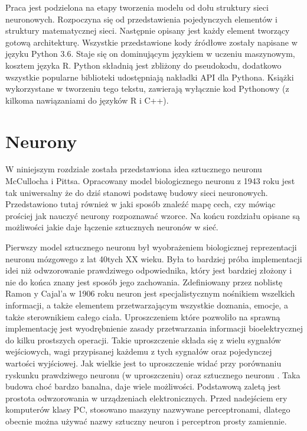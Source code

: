 \documentclass[12pt,a4paper,twoside,titlepage,openright]{book}
\begin{document}
Praca jest podzielona na etapy tworzenia modelu od dołu struktury sieci neuronowych. Rozpoczyna się od przedstawienia pojedynczych elementów i struktury matematycznej sieci. Następnie opisany jest każdy element tworzący gotową architekturę.
Wszystkie przedstawione kody źródłowe zostały napisane w języku Python 3.6. Staje się on dominującym językiem w uczeniu maszynowym, kosztem języka R. Python składnią jest zbliżony do pseudokodu, dodatkowo wszystkie popularne biblioteki udostępniają nakładki API dla Pythona. Książki wykorzystane w tworzeniu tego tekstu, zawierają wyłącznie kod Pythonowy (z kilkoma nawiązaniami do języków R i C++).


\chapter{Neurony}
W niniejszym rozdziale została przedstawiona idea sztucznego neuronu McCullocha i Pittsa. Opracowany model biologicznego neuronu z 1943 roku jest tak uniwersalny że do dziś stanowi podstawę budowy sieci neuronowych. Przedstawiono tutaj również w jaki sposób znaleźć mapę cech, czy mówiąc prościej jak nauczyć neurony rozpoznawać wzorce. Na końcu rozdziału opisane są możliwości jakie daje łączenie sztucznych neuronów w sieć.

Pierwszy model sztucznego neuronu był wyobrażeniem biologicznej reprezentacji neuronu mózgowego z lat 40tych XX wieku. Była to bardziej próba implementacji idei niż odwzorowanie prawdziwego odpowiednika, który jest bardziej złożony i nie do końca znany jest sposób jego zachowania. Zdefiniowany przez noblistę Ramon y Cajal'a w 1906 roku neuron jest specjalistycznym nośnikiem wszelkich informacji, a także elementem przetwarzającym wszystkie doznania, emocje, a także sterownikiem całego ciała. Uproszczeniem które pozwoliło na sprawną implementację jest wyodrębnienie zasady przetwarzania informacji bioelektrycznej do kilku prostszych operacji. Takie uproszczenie składa się z wielu sygnałów wejściowych, wagi przypisanej każdemu z tych sygnałów oraz pojedynczej wartości wyjściowej. Jak wielkie jest to uproszczenie widać przy porównaniu ryskunku prawdziwego neuronu (w uproszczeniu)  oraz sztucznego neuronu . Taka budowa choć bardzo banalna, daje wiele możliwości. Podstawową zaletą jest prostota odwzorowania w urządzeniach elektronicznych. Przed nadejściem ery komputerów klasy PC, stosowano maszyny nazwywane perceptronami, dlatego obecnie można używać nazwy sztuczny neuron i perceptron prosty zamiennie.
\end{document}
